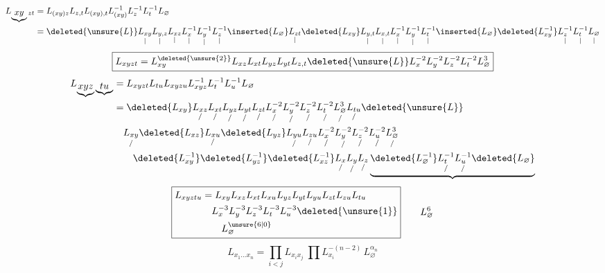 \[
\begin{aligned}
L_{\underbrace{xy}zt}
 &=L_{(xy)z}L_{z,t}L_{(xy),t}L_{(xy)}^{-1}L_z^{-1}L_t^{-1}L_{\varnothing}\\
 &=\deleted{\unsure{L}}\underset{|}{L_{xy}}\underset{|}{L_{y,z}}\underset{|}{L_{xz}}
 \underset{|}{L_x^{-1}}\underset{|}{L_y^{-1}}\underset{|}{L_z^{-1}}\inserted{L_{\varnothing}}
 \underset{|}{L_{zt}}\deleted{L_{xy}}\underset{|}{L_{y,t}}\underset{|}{L_{x,t}}
 \underset{|}{L_x^{-1}}\underset{|}{L_y^{-1}}\underset{|}{L_t^{-1}}\inserted{L_{\varnothing}}
 \deleted{L_{xy}^{-1}}\underset{|}{L_z^{-1}}\underset{|}{L_t^{-1}}\underset{|}{L_{\varnothing}}
\end{aligned}
\]
\[
\boxed{L_{xyzt}=L_{xy}^{\deleted{\unsure{2}}}L_{xz}L_{xt}L_{yz}L_{yt}L_{z,t}
\deleted{\unsure{L}}L_x^{-2}L_y^{-2}L_z^{-2}L_t^{-2}L_{\varnothing}^{3}}
\]
\[
\begin{aligned}
L_{\underbrace{xyz}\underbrace{tu}}&=L_{xyzt}L_{tu}L_{xyzu}L_{xyz}^{-1}L_t^{-1}L_u^{-1}L_{\varnothing}\\
&=\deleted{L_{xy}}\underset{/}{L_{xz}}\underset{/}{L_{xt}}\underset{/}{L_{yz}}\underset{/}{L_{yt}}\underset{/}{L_{zt}}\underset{/}{L_x^{-2}}\underset{/}{L_y^{-2}}\underset{/}{L_z^{-2}}\underset{/}{L_t^{-2}}\underset{/}{L_{\varnothing}^3}\underset{/}{L_{tu}}\deleted{\unsure{L}}\\
&\quad \underset{/}{L_{xy}}\deleted{L_{xz}}\underset{/}{L_{xu}}\deleted{L_{yz}}\underset{/}{L_{yu}}\underset{/}{L_{zu}}\underset{/}{L_x^{-2}}\underset{/}{L_y^{-2}}\underset{/}{L_z^{-2}}\underset{/}{L_u^{-2}}\underset{/}{L_{\varnothing}^3}\\
&\qquad \deleted{L_{xy}^{-1}}\deleted{L_{yz}^{-1}}\deleted{L_{xz}^{-1}}\underset{/}{L_x}\underset{/}{L_y}\underset{/}{L_z}
\underbrace{\deleted{L_{\varnothing}^{-1}}\underset{/}{L_t^{-1}}\underset{/}{L_u^{-1}}\deleted{L_{\varnothing}}}
\end{aligned}
\]
\[
\boxed{\begin{aligned}
L_{xyztu}&=L_{xy}L_{xz}L_{xt}L_{xu}L_{yz}L_{yt}L_{yu}L_{zt}L_{zu}L_{tu}\\
&\quad L_x^{-3}L_y^{-3}L_z^{-3}L_t^{-3}L_u^{-3}\deleted{\unsure{1}}\\
&\qquad L_{\varnothing}^{\unsure{6|0}}
\end{aligned}}\qquad L_{\varnothing}^{6}
\]
\[
L_{x_1\ldots x_n}=\prod_{i<j}L_{x_i x_j}\ \prod L_{x_i}^{-(n-2)}\,L_{\varnothing}^{\alpha_n}
\]
